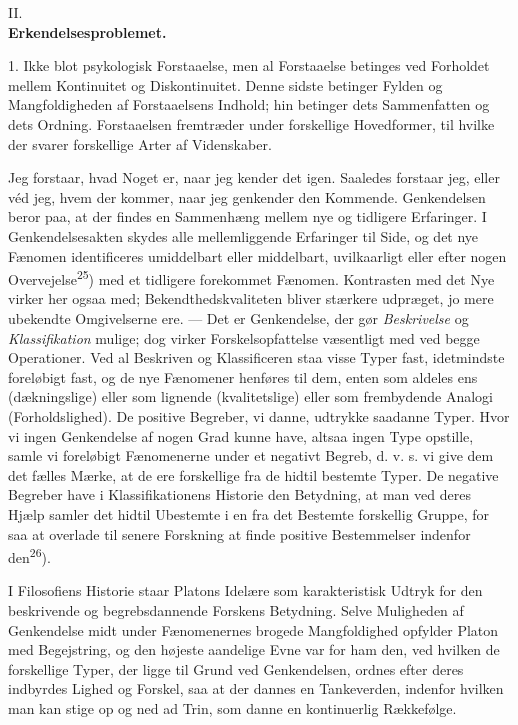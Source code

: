 \documentclass[12pt,a4paper,openany]{book}
\newcommand{\opage}[1]{\marginnote{\footnotesize\textit{[#1]}}}
\begin{document}
\opage{28}

\begin{center}II.\\[6pt]
\textbf{\Large Erkendelsesproblemet.}\end{center}

1. Ikke blot psykologisk Forstaaelse, men al Forstaaelse betinges ved Forholdet
mellem Kontinuitet og Diskontinuitet. Denne sidste betinger Fylden og
Mangfoldigheden af Forstaaelsens Indhold; hin betinger dets Sammenfatten og
dets Ordning. Forstaaelsen fremtræder under forskellige Hovedformer, til hvilke
der svarer forskellige Arter af Videnskaber.

Jeg forstaar, hvad Noget er, naar jeg kender det igen. Saaledes forstaar jeg,
eller véd jeg, hvem der kommer, naar jeg genkender den Kommende. Genkendelsen
beror paa, at der findes en Sammenhæng mellem nye og tidligere Erfaringer. I
Genkendelsesakten skydes alle mellemliggende Erfaringer til Side, og det nye
Fænomen identificeres umiddelbart eller middelbart, uvilkaarligt eller efter
nogen Overvejelse\textsuperscript{25}) med et tidligere forekommet Fænomen.
Kontrasten med det Nye virker her ogsaa med; Bekendthedskvaliteten bliver
stærkere udpræget, jo mere ubekendte Omgivelserne ere. --- Det er Genkendelse,
der gør \textit{Beskrivelse} og \textit{Klassifikation} mulige; dog virker
Forskelsopfattelse væsentligt med ved begge Operationer. Ved al Beskriven og
Klassificeren staa visse Typer fast, idetmindste foreløbigt fast, og de nye
Fænomener henføres til dem, enten som aldeles ens (dækningslige) eller som
lignende (kvalitetslige) eller som frembydende Analogi (Forholdslighed). De
positive Begreber, vi danne, udtrykke saadanne Typer. Hvor vi ingen Genkendelse
af nogen Grad kunne have, altsaa ingen Type
\opage{29}opstille, samle vi foreløbigt Fænomenerne under et negativt Begreb,
d. v. s. vi give dem det fælles Mærke, at de ere forskellige fra de hidtil
bestemte Typer. De negative Begreber have i Klassifikationens Historie den
Betydning, at man ved deres Hjælp samler det hidtil Ubestemte i en fra det
Bestemte forskellig Gruppe, for saa at overlade til senere Forskning at finde
positive Bestemmelser indenfor den\textsuperscript{26}).

I Filosofiens Historie staar Platons Idelære som karakteristisk Udtryk for den
beskrivende og begrebsdannende Forskens Betydning. Selve Muligheden af
Genkendelse midt under Fænomenernes brogede Mangfoldighed opfylder Platon med
Begejstring, og den højeste aandelige Evne var for ham den, ved hvilken de
forskellige Typer, der ligge til Grund ved Genkendelsen, ordnes efter deres
indbyrdes Lighed og Forskel, saa at der dannes en Tankeverden, indenfor hvilken
man kan stige op og ned ad Trin, som danne en kontinuerlig Rækkefølge.
\end{document}
